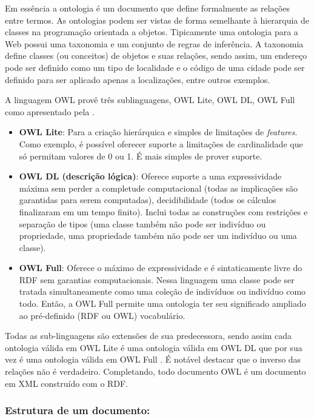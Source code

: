 Em essência a ontologia é um documento que define formalmente as relações entre termos. As ontologias podem ser vistas de forma semelhante à hierarquia de classes na programação orientada a objetos. Tipicamente uma ontologia para a Web possui uma taxonomia e um conjunto de regras de inferência. A taxonomia define classes (ou conceitos) de objetos e suas relações, sendo assim, um endereço pode ser definido como um tipo de localidade e o código de uma cidade pode ser definido para ser aplicado apenas a localizações, entre outros exemplos.

A linguagem OWL provê três sublinguagens, OWL Lite, OWL DL, OWL Full como apresentado pela \cite{OWLW3C}.

\begin{itemize}
	\item{\textbf{OWL Lite}: Para a criação hierárquica e simples de limitações de \textit{features}. Como exemplo, é possível oferecer suporte a limitações de cardinalidade que só permitam valores de 0 ou 1. É mais simples de prover suporte.} 

	\item{\textbf{OWL DL (descrição lógica)}: Oferece suporte a uma expressividade máxima sem perder a completude computacional (todas as implicações são garantidas para serem computadas), decidibilidade (todos os cálculos finalizaram em um tempo finito). Inclui todas as construções com restrições e separação de tipos (uma classe também não pode ser indivíduo ou propriedade, uma propriedade também não pode ser um indivíduo ou uma classe).}

	\item{\textbf{OWL Full}: Oferece o máximo de expressividade e é sintaticamente livre do RDF sem garantias computacionais. Nessa linguagem uma classe pode ser tratada simultaneamente como uma coleção de indivíduos ou indivíduo como todo. Então, a OWL Full permite uma ontologia ter seu significado ampliado ao pré-definido (RDF ou OWL) vocabulário.}
\end{itemize}

Todas as sub-linguagens são extensões de sua predecessora, sendo assim cada ontologia válida em OWL Lite é uma ontologia válida em OWL DL que por sua vez é uma ontologia válida em OWL Full \citep{OWLW3C}. É notável destacar que o inverso das relações não é verdadeiro. Completando, todo documento OWL é um documento em XML construído com o RDF.

\subsubsection{Estrutura de um documento:}


